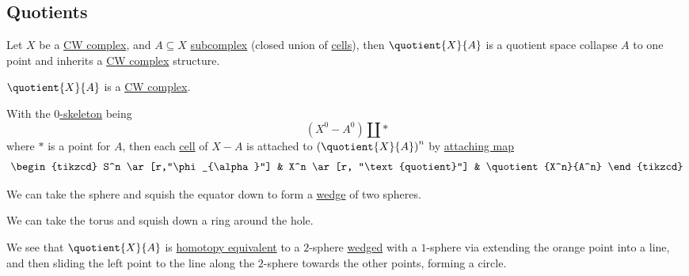 \subsection{Quotients}\label{CW-complex-quotient}
Let \(X\) be a \hyperref[def:CW-Complex]{CW complex}, and \(A\subseteq X\) \hyperref[def:CW-subcomplex]{subcomplex} (closed union of \hyperref[def:cell]{cells}), then
\(\quotient{X}{A}\) is a quotient space collapse \(A\) to one point and inherits a \hyperref[def:CW-Complex]{CW complex} structure.
\begin{remark}
	\(\quotient{X}{A} \) is a \hyperref[def:CW-Complex]{CW complex}.
\end{remark}
\begin{explanation}
	With the \hyperref[def:skeleton]{\(0\)-skeleton} being
	\[
		(X^0 - A^0)\coprod \ast
	\]
	where \(\ast\) is a point for \(A\), then each \hyperref[def:cell]{cell} of \(X-A\) is attached to \(\left(\quotient{X}{A} \right)^n\)
	by \hyperref[def:attaching-map]{attaching map}
	\[
		\begin{tikzcd}
			S^n \ar[r,"\phi_{\alpha}"] & X^n \ar[r, "\text{quotient}"] & \quotient{X^n}{A^n}
		\end{tikzcd}
	\]
\end{explanation}

\begin{eg}
	We can take the sphere and squish the equator down to form a \hyperref[CW-complex-wedge-sum]{wedge} of two spheres.
	\begin{figure}[H]
		\centering
		\label{fig:eg:quotient-cw-complex-sphere}
	\end{figure}
\end{eg}

\begin{eg}
	We can take the torus and squish down a ring around the hole.
	\begin{figure}[H]
		\centering
		\label{fig:eg:quotient-cw-complex-torus}
	\end{figure}
	We see that \(\quotient{X}{A}\) is \hyperref[def:homotopy-equivalence]{homotopy equivalent}
	to a \(2\)-sphere \hyperref[CW-complex-wedge-sum]{wedged} with a \(1\)-sphere via extending the orange point into a line, and then
	sliding the left point to the line along the \(2\)-sphere towards the other points, forming a circle.
\end{eg}
